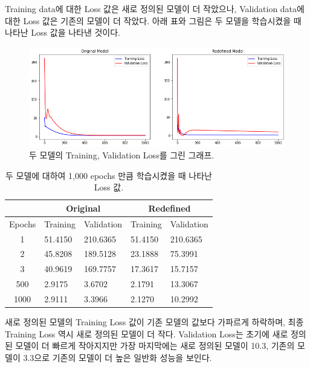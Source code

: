 \documentclass[letterpaper,10pt]{article}
\begin{document}
	Training data에 대한 Loss 값은 새로 정의된 모델이 더 작았으나, Validation data에 대한 Loss 값은 기존의 모델이 더 작았다. 아래 표와 그림은 두 모델을 학습시켰을 때 나타난 Loss 값을 나타낸 것이다.
	
	\begin{figure}[h]
		\centering
		\includegraphics[width=\linewidth]{images/loss-cmp.png}
		\caption{두 모델의 Training, Validation Loss를 그린 그래프.}
	\end{figure}
	
	\begin{table}[]
		\centering
		\begin{tabular}{c|ll|ll}
			\multicolumn{1}{l|}{} & \multicolumn{2}{c|}{Original} & \multicolumn{2}{c}{Redefined} \\ \hline
			Epochs                & Training     & Validation     & Training     & Validation     \\ \hline
			1                     & 51.4150      & 210.6365       & 51.4150      & 210.6365       \\ \hline
			2                     & 45.8208      & 189.5128       & 23.1888      & 75.3991        \\ \hline
			3                     & 40.9619      & 169.7757       & 17.3617      & 15.7157        \\ \hline
			500                   & 2.9175       & 3.6702         & 2.1791       & 13.3067        \\ \hline
			1000                  & 2.9111       & 3.3966         & 2.1270       & 10.2992        \\ \hline
		\end{tabular}
		\caption{두 모델에 대하여 1,000 epochs 만큼 학습시켰을 때 나타난 Loss 값.}
	\end{table}
	
	새로 정의된 모델의 Training Loss 값이 기존 모델의 값보다 가파르게 하락하며, 최종 Training Loss 역시 새로 정의된 모델이 더 작다. Validation Loss는 초기에 새로 정의된 모델이 더 빠르게 작아지지만 가장 마지막에는 새로 정의된 모델이 10.3, 기존의 모델이 3.3으로 기존의 모델이 더 높은 일반화 성능을 보인다. 
	
\end{document}
